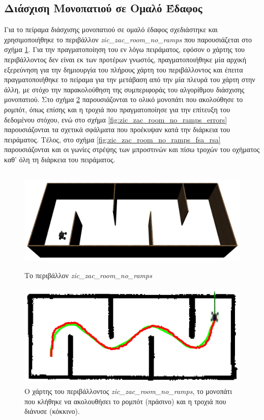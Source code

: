 \subsection{Διάσχιση Μονοπατιού σε Ομαλό Έδαφος}
Για το πείραμα διάσχισης μονοπατιού σε ομαλό έδαφος σχεδιάστηκε και χρησιμοποιήθηκε το περιβάλλον \textit{zic{\_}zac{\_}room{\_}no{\_}ramps} που παρουσιάζεται στο σχήμα \ref{fig:zic_zac_room_no_ramps}. Για την πραγματοποίηση του εν λόγω πειράματος, εφόσον ο χάρτης του περιβάλλοντος δεν είναι εκ των προτέρων γνωστός, πραγματοποιήθηκε μία αρχική εξερεύνηση για την δημιουργία του πλήρους χάρτη του περιβάλλοντος και έπειτα πραγματοποιήθηκε το πείραμα για την μετάβαση από την μία πλευρά του χάρτη στην άλλη, με στόχο την παρακολούθηση της συμπεριφοράς του αλγορίθμου διάσχισης μονοπατιού. Στο σχήμα \ref{fig:zic_zac_room_no_ramps_path_and_traj} παρουσιάζονται το ολικό μονοπάτι που ακολούθησε το ρομπότ, όπως επίσης και η τροχιά που πραγματοποίησε για την επίτευξη του δεδομένου στόχου, ενώ στο σχήμα \ref{fig:zic_zac_room_no_ramps_errors} παρουσιάζονται τα σχετικά σφάλματα που προέκυψαν κατά την διάρκεια του πειράματος. Τέλος, στο σχήμα \ref{fig:zic_zac_room_no_ramps_fsa_rsa} παρουσιάζονται και οι γωνίες στρέψης των μπροστινών και πίσω τροχών του οχήματος καθ' όλη τη διάρκεια του πειράματος.

\begin{figure}[!ht]
	\centering
	\includegraphics[height=5cm]{Chapters/Chapter5/Figures/ptc_experiments/zic_zac_room_no_ramps.jpg}
	\caption{Το περιβάλλον \textit{zic{\_}zac{\_}room{\_}no{\_}ramps}}
	\label{fig:zic_zac_room_no_ramps}
\end{figure}	
	
\begin{figure}[!ht]
	\centering
	\includegraphics[height=5cm]{Chapters/Chapter5/Figures/ptc_experiments/zic_zac_room_no_ramps_path_and_traj.png}
	\caption{Ο χάρτης του περιβάλλοντος \textit{zic{\_}zac{\_}room{\_}no{\_}ramps}, το μονοπάτι που κλήθηκε να ακολουθήσει το ρομπότ (πράσινο) και η τροχιά που διάνυσε (κόκκινο).}
	\label{fig:zic_zac_room_no_ramps_path_and_traj}
\end{figure}

